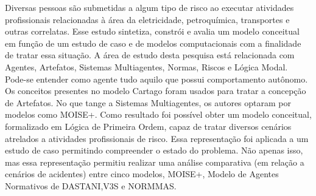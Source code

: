 Diversas pessoas são submetidas a algum tipo de risco ao executar atividades profissionais relacionadas à área da eletricidade, petroquímica, transportes e outras correlatas. Esse estudo sintetiza, constrói e avalia um modelo conceitual em função de um estudo de caso e de modelos computacionais com a finalidade de tratar essa situação.  A área de estudo desta pesquisa está relacionada com Agentes, Artefatos, Sistemas Multiagentes, Normas, Riscos e Lógica Modal. Pode-se entender como agente tudo aquilo que possui comportamento autônomo. Os conceitos presentes no modelo Cartago foram usados para tratar a concepção de Artefatos. No que tange a Sistemas Multiagentes, os autores optaram por modelos como MOISE+. Como resultado foi possível obter um modelo conceitual, formalizado em Lógica de Primeira Ordem, capaz de tratar diversos cenários atrelados a atividades profissionais de risco. Essa representação foi aplicada a um estudo de caso permitindo compreender o estado do problema. Não apenas isso, mas essa representação permitiu realizar uma análise comparativa (em relação a cenários de acidentes) entre cinco modelos, MOISE+, Modelo de Agentes Normativos de DASTANI,V3S e NORMMAS.